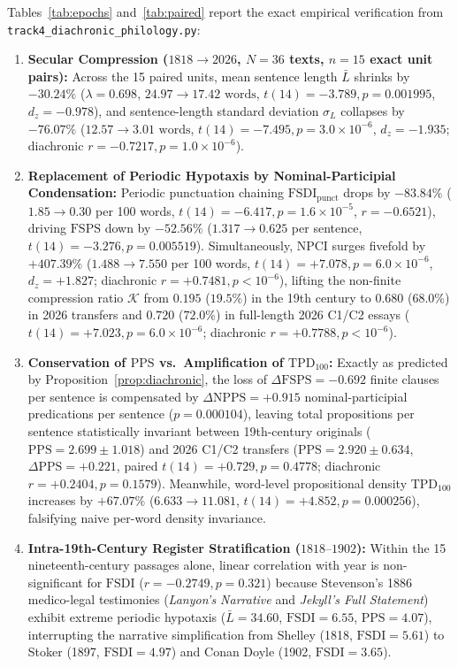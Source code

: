 \documentclass[11pt,reqno]{article}
\begin{document}
Tables~\ref{tab:epochs} and~\ref{tab:paired} report the exact empirical verification from \texttt{track4\_diachronic\_philology.py}:
\begin{enumerate}
    \item \textbf{Secular Compression ($1818 \to 2026$, $N=36$ texts, $n=15$ exact unit pairs):} Across the 15 paired units, mean sentence length $\bar{L}$ shrinks by $-30.24\%$ ($\lambda = 0.698$, $24.97 \to 17.42\text{ words}$, $t(14) = -3.789, p = 0.001995$, $d_z = -0.978$), and sentence-length standard deviation $\sigma_L$ collapses by $-76.07\%$ ($12.57 \to 3.01\text{ words}$, $t(14) = -7.495, p = 3.0\times 10^{-6}$, $d_z = -1.935$; diachronic $r = -0.7217, p = 1.0\times 10^{-6}$).
    \item \textbf{Replacement of Periodic Hypotaxis by Nominal-Participial Condensation:} Periodic punctuation chaining $\mathrm{FSDI}_{\mathrm{punct}}$ drops by $-83.84\%$ ($1.85 \to 0.30$ per 100 words, $t(14) = -6.417, p = 1.6\times 10^{-5}$, $r = -0.6521$), driving $\mathrm{FSPS}$ down by $-52.56\%$ ($1.317 \to 0.625$ per sentence, $t(14) = -3.276, p = 0.005519$). Simultaneously, $\mathrm{NPCI}$ surges fivefold by $+407.39\%$ ($1.488 \to 7.550$ per 100 words, $t(14) = +7.078, p = 6.0\times 10^{-6}$, $d_z = +1.827$; diachronic $r = +0.7481, p < 10^{-6}$), lifting the non-finite compression ratio $\mathcal{K}$ from $0.195$ ($19.5\%$) in the 19th century to $0.680$ ($68.0\%$) in 2026 transfers and $0.720$ ($72.0\%$) in full-length 2026 C1/C2 essays ($t(14) = +7.023, p = 6.0\times 10^{-6}$; diachronic $r = +0.7788, p < 10^{-6}$).
    \item \textbf{Conservation of $\mathrm{PPS}$ vs.\ Amplification of $\mathrm{TPD}_{100}$:} Exactly as predicted by Proposition~\ref{prop:diachronic}, the loss of $\Delta\mathrm{FSPS} = -0.692$ finite clauses per sentence is compensated by $\Delta\mathrm{NPPS} = +0.915$ nominal-participial predications per sentence ($p = 0.000104$), leaving total propositions per sentence statistically invariant between 19th-century originals ($\mathrm{PPS} = 2.699 \pm 1.018$) and 2026 C1/C2 transfers ($\mathrm{PPS} = 2.920 \pm 0.634$, $\Delta\mathrm{PPS} = +0.221$, paired $t(14) = +0.729, p = 0.4778$; diachronic $r = +0.2404, p = 0.1579$). Meanwhile, word-level propositional density $\mathrm{TPD}_{100}$ increases by $+67.07\%$ ($6.633 \to 11.081$, $t(14) = +4.852, p = 0.000256$), falsifying naive per-word density invariance.
    \item \textbf{Intra-19th-Century Register Stratification ($1818\text{--}1902$):} Within the 15 nineteenth-century passages alone, linear correlation with year is non-significant for $\mathrm{FSDI}$ ($r = -0.2749, p = 0.321$) because Stevenson's 1886 medico-legal testimonies (\emph{Lanyon's Narrative} and \emph{Jekyll's Full Statement}) exhibit extreme periodic hypotaxis ($\bar{L} = 34.60$, $\mathrm{FSDI} = 6.55$, $\mathrm{PPS} = 4.07$), interrupting the narrative simplification from Shelley (1818, $\mathrm{FSDI}=5.61$) to Stoker (1897, $\mathrm{FSDI}=4.97$) and Conan Doyle (1902, $\mathrm{FSDI}=3.65$).
\end{enumerate}
\end{document}
